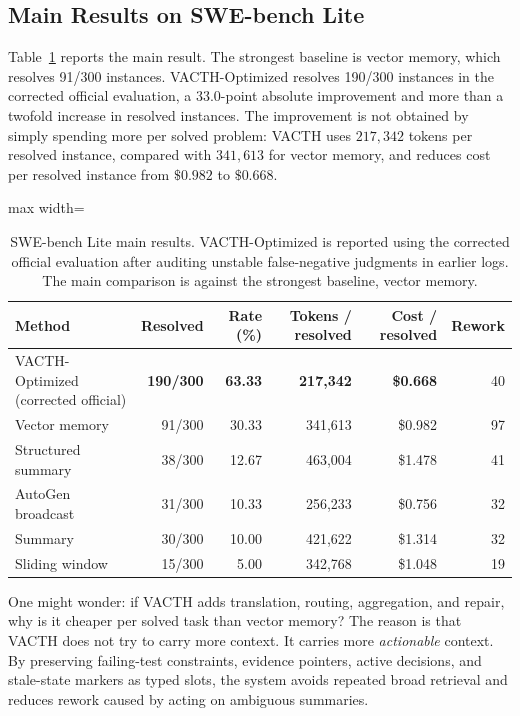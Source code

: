 \documentclass{article} %
\begin{document}
\subsection{Main Results on SWE-bench Lite}

Table~\ref{tab:swebench_main} reports the main result. The strongest baseline is vector memory, which resolves 91/300 instances. VACTH-Optimized resolves 190/300 instances in the corrected official evaluation, a $33.0$-point absolute improvement and more than a twofold increase in resolved instances. The improvement is not obtained by simply spending more per solved problem: VACTH uses $217{,}342$ tokens per resolved instance, compared with $341{,}613$ for vector memory, and reduces cost per resolved instance from $\$0.982$ to $\$0.668$.

\begin{table}[t]
\centering
\small
\begin{adjustbox}{max width=\textwidth}
\begin{tabular}{lrrrrr}
\toprule
Method & Resolved & Rate (\%) & Tokens / resolved & Cost / resolved & Rework \\
\midrule
VACTH-Optimized (corrected official) & \textbf{190/300} & \textbf{63.33} & \textbf{217{,}342} & \textbf{\$0.668} & 40 \\
Vector memory & 91/300 & 30.33 & 341{,}613 & \$0.982 & 97 \\
Structured summary & 38/300 & 12.67 & 463{,}004 & \$1.478 & 41 \\
AutoGen broadcast & 31/300 & 10.33 & 256{,}233 & \$0.756 & 32 \\
Summary & 30/300 & 10.00 & 421{,}622 & \$1.314 & 32 \\
Sliding window & 15/300 & 5.00 & 342{,}768 & \$1.048 & 19 \\
\bottomrule
\end{tabular}
\end{adjustbox}
\caption{SWE-bench Lite main results. VACTH-Optimized is reported using the corrected official evaluation after auditing unstable false-negative judgments in earlier logs. The main comparison is against the strongest baseline, vector memory.}
\label{tab:swebench_main}
\end{table}

One might wonder: if VACTH adds translation, routing, aggregation, and repair, why is it cheaper per solved task than vector memory? The reason is that VACTH does not try to carry more context. It carries more \emph{actionable} context. By preserving failing-test constraints, evidence pointers, active decisions, and stale-state markers as typed slots, the system avoids repeated broad retrieval and reduces rework caused by acting on ambiguous summaries.
\end{document}
